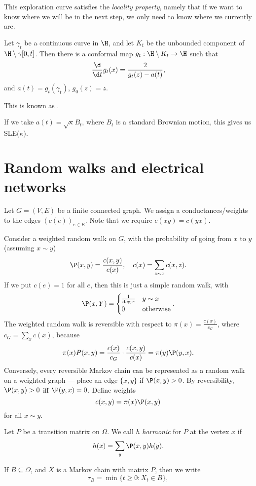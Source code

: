 \documentclass[a4paper]{article}
\begin{document}
This exploration curve satisfies the \emph{locality property}, namely that if we want to know where we will be in the next step, we only need to know where we currently are.

Let $\gamma_t$ be a continuous curve in $\H$, and let $K_t$ be the unbounded component of $\H \setminus \gamma [0, t]$. Then there is a conformal map $g_t: \H \setminus K_t \to \H$ such that
\[
  \frac{\d}{\d t} g_t(x) = \frac{2}{g_t(z) - a(t)},
\]
and $a(t) = g_t(\gamma_t)$, $g_0(z) = z$.

This is known as .

If we take $a(t) = \sqrt{\kappa} B_t$, where $B_t$ is a standard Brownian motion, this gives us SLE($\kappa$).

\section{Random walks and electrical networks}
Let $G = (V, E)$ be a finite connected graph. We assign a conductances/weights to the edges $(c(e))_{e \in E}$. Note that we require $c(xy) = c(yx)$.

Consider a weighted random walk on $G$, with the probability of going from $x$ to $y$ (assuming $x \sim y$)
\[
  \P(x, y) = \frac{c(x, y)}{ c(x)},\quad c(x) = \sum_{z \sim x} c(x, z).
\]
If we put $c(e) = 1$ for all $e$, then this is just a simple random walk, with
\[
  \P(x, Y) =
  \begin{cases}
    \frac{1}{\deg x} & y \sim x\\
    0 & \text{otherwise}
  \end{cases}.
\]
The weighted random walk is reversible with respect to $\pi(x) = \frac{c(x)}{c_G}$, where $c_G = \sum_x c(x)$, because
\[
  \pi(x) P(x, y) = \frac{c(x)}{c_G} \cdot \frac{c(x, y)}{c(x)} = \pi(y) \P(y, x).
\]
Conversely, every reversible Markov chain can be represented as a random walk on a weighted graph --- place an edge $\{x, y\}$ if $\P(x, y) > 0$. By reversibility, $\P(x, y) > 0$ iff $\P(y, x) = 0$. Define weights
\[
  c(x, y) = \pi(x) \P(x, y)
\]
for all $x \sim y$.

\begin{defi}
  Let $P$ be a transition matrix on $\Omega$. We call $h$ \emph{harmonic} for $P$ at the vertex $x$ if
  \[
    h(x) = \sum_y \P(x, y) h(y).
  \]
\end{defi}
If $B \subseteq \Omega$, and $X$ is a Markov chain with matrix $P$, then we write
\[
  \tau_B = \min\{t \geq 0: X_t \in B\},
\]
\end{document}
